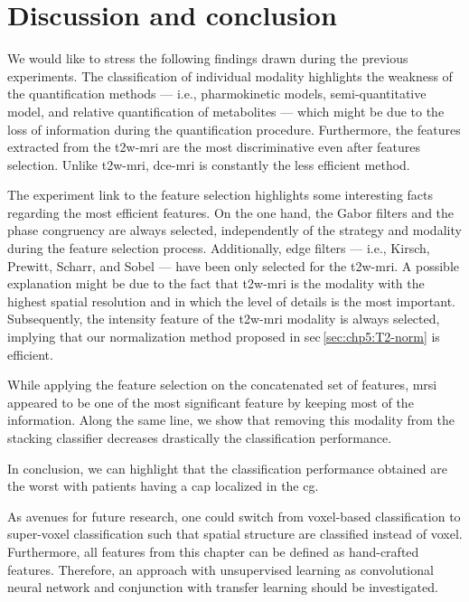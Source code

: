 \section{Discussion and conclusion}\label{sec:chp6:discussion}

We would like to stress the following findings drawn during the previous experiments.
The classification of individual modality highlights the weakness of the quantification methods --- i.e., pharmokinetic models, semi-quantitative model, and relative quantification of metabolites --- which might be due to the loss of information during the quantification procedure.
Furthermore, the features extracted from the \ac{t2w}-\ac{mri} are the most discriminative even after features selection.
Unlike \ac{t2w}-\ac{mri}, \ac{dce}-\ac{mri} is constantly the less efficient method.

The experiment link to the feature selection highlights some interesting facts regarding the most efficient features.
On the one hand, the Gabor filters and the phase congruency are always selected, independently of the strategy and modality during the feature selection process.
Additionally, edge filters --- i.e., Kirsch, Prewitt, Scharr, and Sobel --- have been only selected for the \ac{t2w}-\ac{mri}.
A possible explanation might be due to the fact that \ac{t2w}-\ac{mri} is the modality with the highest spatial resolution and in which the level of details is the most important.
Subsequently, the intensity feature of the \ac{t2w}-\ac{mri} modality is always selected, implying that our normalization method proposed in \acs{sec}\,\ref{sec:chp5:T2-norm} is efficient.

While applying the feature selection on the concatenated set of features, \ac{mrsi} appeared to be one of the most significant feature by keeping most of the information.
Along the same line, we show that removing this modality from the stacking classifier decreases drastically the classification performance.

In conclusion, we can highlight that the classification performance obtained are the worst with patients having a \ac{cap} localized in the \ac{cg}. 

As avenues for future research, one could switch from voxel-based classification to super-voxel classification such that spatial structure are classified instead of voxel.
Furthermore, all features from this chapter can be defined as hand-crafted features.
Therefore, an approach with unsupervised learning as convolutional neural network and conjunction with transfer learning should be investigated.

